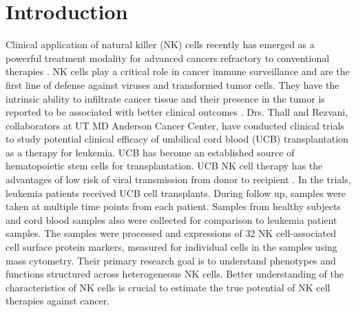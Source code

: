 \documentclass[12pt,]{article}
\begin{document}
\section{Introduction}
Clinical application of natural killer (NK) cells
recently has emerged as a powerful treatment modality for advanced cancers
refractory to conventional therapies \citep{rezvani2015application}. 
NK cells play a critical role in cancer immune surveillance and are the first
line of defense against viruses and transformed tumor cells.  They have the
intrinsic ability to infiltrate cancer tissue and their presence in the tumor
is reported to be associated with better clinical outcomes
\citep{suck2016natural}.  
Drs. Thall and Rezvani, collaborators at UT MD Anderson Cancer Center, have
conducted clinical trials to study potential clinical efficacy of umbilical
cord blood (UCB) transplantation as a therapy for leukemia.  UCB has become an
established source of hematopoietic stem cells for transplantation. UCB NK cell
therapy has the advantages of low risk of viral transmission from donor to
recipient \citep{sarvaria2017umbilical}. In the trials, leukemia patients
received UCB cell transplants.
During follow up, samples were taken at multiple time points from each patient.
Samples from
healthy subjects and cord blood samples also were collected for comparison to
leukemia patient samples.  The samples were processed and expressions of 32 NK
cell-associated cell surface protein markers,
measured for individual cells in the samples using mass cytometry.  Their
primary research goal is to understand phenotypes and functions structured
across heterogeneous NK cells.
Better understanding of the characteristics of NK cells is crucial to estimate
the true potential of NK cell therapies against cancer.
\end{document}
